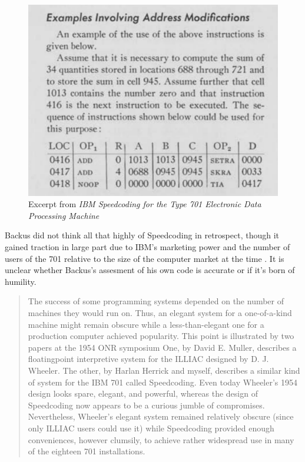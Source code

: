 \begin{figure}[h!]
    \centering
    \includegraphics[width=0.5\linewidth]{resource/ibm-speedcoding-example.png}
    \caption{Excerpt from \textit{IBM Speedcoding for the Type 701 Electronic Data Processing Machine}
        \cite{IBM_1954_Speedcoding}}
    \label{fig:ibm-speedcoding-example}
\end{figure}

Backus did not think all that highly of Speedcoding in retrospect, though it
gained traction in large part due to IBM's marketing power and the number of
users of the 701 relative to the size of the computer market at the time
\cite{Backus_1980_Programming_in_America_in_1950s}. It is unclear whether
Backus's assesment of his own code is accurate or if it's born of humility.

\begin{quotation}
    The success of some programming systems depended on the number of machines
    they would run on. Thus, an elegant system for a one-of-a-kind machine might
    remain obscure while a less-than-elegant one for a production computer achieved
    popularity. This point is illustrated by two papers at the 1954 ONR symposium
    One, by David E. Muller, describes a floatingpoint interpretive system for
    the ILLIAC designed by D. J. Wheeler. The other, by Harlan Herrick and myself,
    describes a similar kind of system for the IBM 701 called Speedcoding. Even
    today Wheeler's 1954 design looks spare, elegant, and powerful, whereas the
    design of Speedcoding now appears to be a curious jumble of compromises.
    Nevertheless, Wheeler's elegant system remained relatively obscure (since only
    ILLIAC users could use it) while Speedcoding provided enough conveniences,
    however clumsily, to achieve rather widespread use in many of the eighteen 701
    installations.
\end{quotation}

